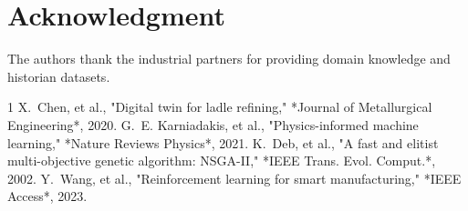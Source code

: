 \documentclass[conference]{IEEEtran}
\begin{document}
\section*{Acknowledgment}
The authors thank the industrial partners for providing domain knowledge and historian datasets.

\begin{thebibliography}{1}
 X.~Chen, et al., "Digital twin for ladle refining," *Journal of Metallurgical Engineering*, 2020.
 G.~E. Karniadakis, et al., "Physics-informed machine learning," *Nature Reviews Physics*, 2021.
 K.~Deb, et al., "A fast and elitist multi-objective genetic algorithm: NSGA-II," *IEEE Trans. Evol. Comput.*, 2002.
 Y.~Wang, et al., "Reinforcement learning for smart manufacturing," *IEEE Access*, 2023.
\end{thebibliography}
\end{document}
